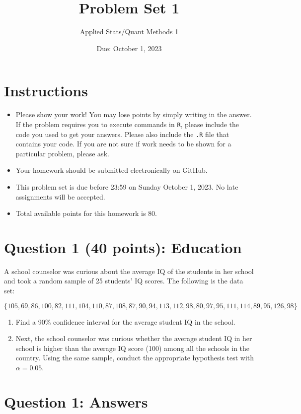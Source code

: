\documentclass[12pt,letterpaper]{article}
\title{Problem Set 1}
\date{Due: October 1, 2023}
\author{Applied Stats/Quant Methods 1}
\begin{document}
	\maketitle

	\section*{Instructions}
	\begin{itemize}
		\item Please show your work! You may lose points by simply writing in the answer. If the problem requires you to execute commands in \texttt{R}, please include the code you used to get your answers. Please also include the \texttt{.R} file that contains your code. If you are not sure if work needs to be shown for a particular problem, please ask.
		\item Your homework should be submitted electronically on GitHub.
		\item This problem set is due before 23:59 on Sunday October 1, 2023. No late assignments will be accepted.
		\item Total available points for this homework is 80.
	\end{itemize}
	
	\section*{Question 1 (40 points): Education}
	A school counselor was curious about the average IQ of the students in her school and took a random sample of 25 students' IQ scores. The following is the data set:
	
	\[ \{105, 69, 86, 100, 82, 111, 104, 110, 87, 108, 87, 90, 94, 113, 112, 98, 80, 97, 95, 111, 114, 89, 95, 126, 98\} \]
	
	\begin{enumerate}
		\item Find a 90\% confidence interval for the average student IQ in the school.
		\item Next, the school counselor was curious whether the average student IQ in her school is higher than the average IQ score (100) among all the schools in the country. Using the same sample, conduct the appropriate hypothesis test with $\alpha=0.05$.
	\end{enumerate}
	
	\section*{Question 1: Answers}
	
\end{document}
